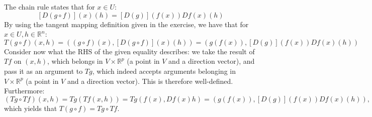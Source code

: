 \begin{solution}

    The chain rule states that for $x \in U$:
    $$[D(g \circ f)](x)(h) = [D(g)](f(x))Df(x)(h)$$
    By using the tangent mapping definition given in the exercise, we have that for $x \in U, h \in \mathbb{R}^n$:
    $$T(g \circ f)(x, h) = ((g \circ f)(x), [D(g \circ f)](x)(h)) = (g(f(x)), [D(g)](f(x))Df(x)(h))$$
    Consider now what the RHS of the given equality describes: we take the result of $Tf$ on $(x, h)$, which belongs in $V \times \mathbb{R}^p$ (a point in $V$ and a direction vector), and pass it as an argument to $Tg$, which indeed accepts arguments belonging in $V \times \mathbb{R}^p$ (a point in $V$ and a direction vector).
    This is therefore well-defined.
    Furthermore:
    $$(Tg \circ Tf)(x, h) = Tg(Tf(x, h)) = Tg(f(x), Df(x)h) = (g(f(x)), [D(g)](f(x))Df(x)(h)),$$
    which yields that $T(g \circ f) = Tg \circ Tf$.
\end{solution}

